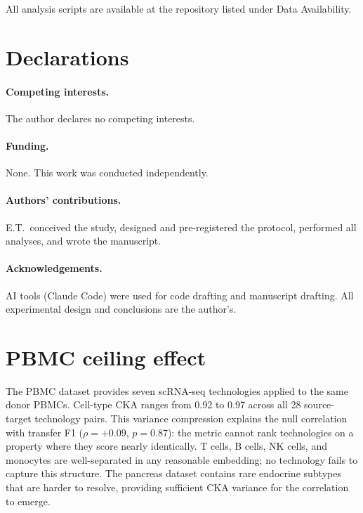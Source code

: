 \documentclass[11pt]{article}
\begin{document}
All analysis scripts are available at the repository listed under Data
Availability.

\section*{Declarations}

\paragraph{Competing interests.} The author declares no competing
interests.

\paragraph{Funding.} None. This work was conducted independently.

\paragraph{Authors' contributions.} E.T.\ conceived the study,
designed and pre-registered the protocol, performed all analyses, and
wrote the manuscript.

\paragraph{Acknowledgements.} AI tools (Claude Code) were used for code
drafting and manuscript drafting. All experimental design and conclusions
are the author's.


\appendix

\section{PBMC ceiling effect}
\label{app:pbmc}

The PBMC dataset \citep{ding2020systematic} provides seven scRNA-seq
technologies applied to the same donor PBMCs. Cell-type CKA ranges from
0.92 to 0.97 across all 28 source-target technology pairs. This
variance compression explains the null correlation with transfer F1
($\rho = +0.09$, $p = 0.87$): the metric cannot rank technologies on
a property where they score nearly identically. T cells, B cells, NK
cells, and monocytes are well-separated in any reasonable embedding; no
technology fails to capture this structure. The pancreas dataset contains
rare endocrine subtypes that are harder to resolve, providing sufficient
CKA variance for the correlation to emerge.
\end{document}
